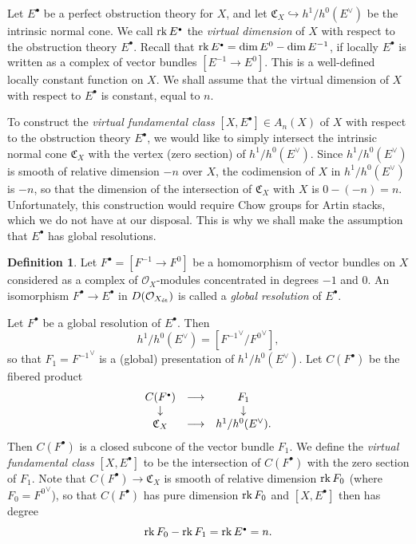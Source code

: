 \documentclass[11pt]{article}
\theoremstyle{plain}
\theoremstyle{definition}
\newtheorem{defnp}[prop]{Definition}
\newenvironment{defn}{\begin{defnp}\normalfont}{\end{defnp}}
\newcommand{\dual}[1]{{{#1}^{\vee}}}
\newcommand{\et}{{\mbox{\tiny \'{e}t}}}
\newcommand{\com}{^{\scriptscriptstyle\bullet}}
\newcommand{\CC}{{\mathfrak{C}}}
\renewcommand{\O}{{\mathcal{O}}}
\newcommand{\rk}{\mathop{\rm rk}}
\newcommand{\ldiag}[1]
       {\makebox[0cm]{\({\scriptstyle#1}\downarrow\phantom{\scriptstyle#1}\)}}
\newcommand{\rdiag}[1]
       {\makebox[0cm]{\(\phantom{\scriptstyle#1}\downarrow{\scriptstyle#1}\)}}
\newcommand{\comdia}[9]{
\begin{array}{ccc}
#1 & \stackrel{#2}{\longrightarrow} & #3 \\
\ldiag{#4} & #5 & \rdiag{#6} \\
#7 & \stackrel{#8}{\longrightarrow} & #9
\end{array}}
\theoremstyle{plain}
\theoremstyle{definition}
\theoremstyle{remark}
\begin{document}
Let \(E\com\) be a perfect obstruction theory for \(X\), and let
\(\CC_X\hookrightarrow h^1/h^0(\dual{E})\) be the intrinsic normal
cone. We call \(\rk E\com\) the {\em virtual dimension }of \(X\) with
respect to the obstruction theory \(E\com\). Recall that \(\rk E\com=\dim
E^0-\dim E^{-1}\), if locally \(E\com\) is written as a complex of vector
bundles \([E^{-1}\rightarrow E^0]\). This is a well-defined locally
constant function on \(X\). We shall assume that the virtual dimension
of \(X\) with respect to \(E\com\) is constant, equal to \(n\).

To construct the {\em virtual fundamental class }\([X,E\com]\in A_n(X)\)
of \(X\) with respect to the obstruction theory \(E\com\), we would like
to simply intersect the intrinsic normal cone \(\CC_X\) with the vertex
(zero section) of \(h^1/h^0(\dual{E})\). Since \(h^1/h^0(\dual{E})\) is
smooth of relative dimension \(-n\) over \(X\), the codimension of \(X\) in
\(h^1/h^0(\dual{E})\) is \(-n\), so that the dimension of the intersection
of \(\CC_X\) with \(X\) is \(0-(-n)=n\). Unfortunately, this construction would
require Chow groups for Artin stacks, which we do not have at our
disposal. This is why we shall make the assumption that \(E\com\) has
global resolutions.

\begin{defn} Let \(F\com=[F^{-1}\rightarrow F^0]\) be a homomorphism of vector
bundles on \(X\) considered as a complex of \(\O_X\)-modules concentrated in
degrees
\(-1\) and \(0\). An isomorphism \(F\com\rightarrow E\com\) in \(D(\O_{X_\et})\) is
called a {\em global resolution }of \(E\com\).
\end{defn}

Let \(F\com\) be a global resolution of \(E\com\). Then
\[
h^1/h^0(\dual{E})=[\dual{F^{-1}}/\dual{F^0}],
\]
so that \(F_1=\dual{F^{-1}}\)
is
a (global) presentation of \(h^1/h^0(\dual{E})\). Let \(C(F\com)\) be the fibered
product
\[
\comdia{C(F\com)}{}{F_1}{}{}{}{\CC_X}{}{h^1/h^0(\dual{E}).}
\]
Then \(C(F\com)\) is a closed subcone of the vector bundle \(F_1\). We
define the {\em virtual fundamental class }\([X,E\com]\) to be the
intersection of \(C(F\com)\) with the zero section of \(F_1\). Note that
\(C(F\com)\rightarrow \CC_X\) is smooth of relative dimension \(\rk F_0\)
(where \(F_0=\dual{F^0}\)), so that \(C(F\com)\) has pure dimension \(\rk
F_0\) and \([X,E\com]\) then has degree
\[
\rk F_0-\rk F_1=\rk E\com =n.
\]
\end{document}

